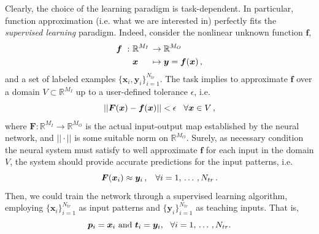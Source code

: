 \documentclass[11pt, a4paper]{report}
\numberwithin{equation}{chapter}
\theoremstyle{theorem}
\theoremstyle{definition}
\numberwithin{figure}{section}
\begin{document}
		Clearly, the choice of the learning paradigm is task-dependent. In particular, function approximation (i.e. what we are interested in) perfectly fits the \emph{supervised learning} paradigm. Indeed, consider the nonlinear unknown function $\boldsymbol{f}$,
		\begin{equation*}
			\begin{aligned}
				\boldsymbol{f} ~ : ~ & \mathbb{R}^{M_I} \hspace*{-0.3cm} && \rightarrow \mathbb{R}^{M_O} \\
								   & \boldsymbol{x} && \mapsto \boldsymbol{y} = \boldsymbol{f}(\boldsymbol{x}) \, ,
			\end{aligned}
		\end{equation*}
		and a set of labeled examples $\lbrace \boldsymbol{x}_i, \boldsymbol{y}_i \rbrace_{i = 1}^{N_{tr}}$. The task implies to approximate $\boldsymbol{f}$ over a domain $V \subset \mathbb{R}^{M_I}$ up to a user-defined tolerance $\epsilon$, i.e.
		\begin{equation*}
			||\boldsymbol{F}(\boldsymbol{x}) - \boldsymbol{f}(\boldsymbol{x})|| < \epsilon \hspace*{0.3cm} \text{$\forall \boldsymbol{x} \in V$} \, ,
		\end{equation*}
		where $\boldsymbol{F} : \mathbb{R}^{M_I} \rightarrow \mathbb{R}^{M_O}$ is the actual input-output map established by the neural network, and $||\cdot||$ is some suitable norm on $\mathbb{R}^{M_O}$. Surely, as necessary condition the neural system must satisfy to well approximate $\boldsymbol{f}$ for each input in the domain $V$, the system should provide accurate predictions for the input patterns, i.e. 
		\begin{equation*}
			\boldsymbol{F}(\boldsymbol{x}_i) \approx \boldsymbol{y}_i \, , \hspace*{0.3cm} \text{$\forall i = 1, \, \ldots \, , N_{tr}$} \, .
		\end{equation*} 
		Then, we could train the network through a supervised learning algorithm, employing $\lbrace \boldsymbol{x}_i \rbrace_{i = 1}^{N_{tr}}$ as input patterns and $\lbrace \boldsymbol{y}_i \rbrace_{i = 1}^{N_{tr}}$ as teaching inputs. That is, 
		\begin{equation*}
			\text{$\boldsymbol{p}_i = \boldsymbol{x}_i$ and $\boldsymbol{t}_i = \boldsymbol{y}_i$,} \hspace*{0.3cm} \text{$\forall i = 1, \, \ldots \, , N_{tr}$.}
		\end{equation*}
		
\end{document}
